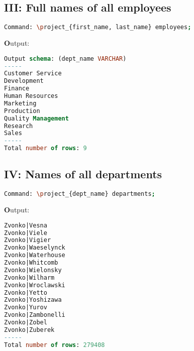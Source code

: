 \documentclass[12pt]{report}
\begin{document}
\subsection*{III: Full names of all employees}
\begin{lstlisting}[language=bash]
Command: \project_{first_name, last_name} employees;
\end{lstlisting}
\textbf Output:
\begin{lstlisting}[language=sql]
Output schema: (dept_name VARCHAR)
-----
Customer Service
Development
Finance
Human Resources
Marketing
Production
Quality Management
Research
Sales
-----
Total number of rows: 9
\end{lstlisting}


\subsection*{IV: Names of all departments}
\begin{lstlisting}[language=bash]
Command: \project_{dept_name} departments;
\end{lstlisting}
\textbf Output:


\begin{lstlisting}[language=sql]
Zvonko|Vesna
Zvonko|Viele
Zvonko|Vigier
Zvonko|Waeselynck
Zvonko|Waterhouse
Zvonko|Whitcomb
Zvonko|Wielonsky
Zvonko|Wilharm
Zvonko|Wroclawski
Zvonko|Yetto
Zvonko|Yoshizawa
Zvonko|Yurov
Zvonko|Zambonelli
Zvonko|Zobel
Zvonko|Zuberek
-----
Total number of rows: 279408

\end{lstlisting}
\end{document}

